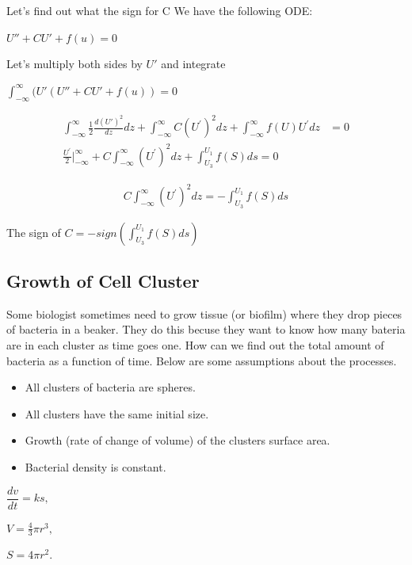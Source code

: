 \documentclass[]{article}
\numberwithin{equation}{section}		%
\begin{document}
Let's find out what the sign for C
We have the following ODE:

\begin{center}
$U'' + CU' + f(u) = 0$
\end{center}

Let's multiply both sides by $U'$ and integrate

\begin{center}
$\int _{-\infty}^{\infty} (U' (U''+CU'+f (u ) )=0$
\end{center}

\begin{align}
\int_{-\infty}^{\infty}\frac{1}{2}\frac{d({U}')^2}{dz}dz+\int_{-\infty}^{\infty}C(U^{'})^{2}dz+\int_{-\infty}^{\infty}f(U)U^{'}dz & =0\\
\frac{U^{'}}{2}|_{-\infty}^{\infty}\nonumber+C\int_{-\infty}^{\infty}(U^{'})^{2}dz\nonumber+\int_{U_{3}}^{U_{1}}f(S)ds=0
\end{align}

\begin{align}
C\int_{-\infty}^{\infty}(U^{'})^{2}dz\nonumber=-\int_{U_{3}}^{U_{1}}f(S)ds
\end{align}

The sign of $C = -sign (\int _{U_3}^{U_1}f (S )ds )$

\subsection{Growth of Cell Cluster}
Some biologist sometimes need to grow tissue (or biofilm) where they drop pieces of bacteria in a beaker. They do this becuse they want to know how many bateria are in each cluster as time goes one. How can we find out the total amount of bacteria as a function of time. Below are some assumptions about the processes.

\begin{itemize}
	\item All clusters of bacteria are spheres.
	\item All clusters have the same initial size.
	\item Growth (rate of change of volume) of the clusters \propto surface area.
	\item Bacterial density is constant.
\end{itemize}
\begin{center}
$\dfrac{dv}{dt}=ks,$
\end{center}
\begin{center}
$V=\frac{4}{3}\pi r^{3},$
\end{center}
\begin{center}
$S=4\pi r^{2}.$
\end{center}
\end{document}
